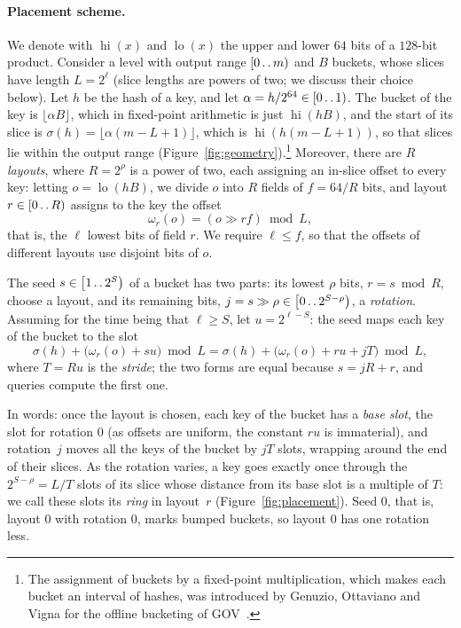 \documentclass[11pt]{article}
\def\..{\,\mathpunct{\ldotp\ldotp}} %
\newcommand{\hi}{\operatorname{hi}}
\begin{document}
\paragraph{Placement scheme.}
We denote with $\hi(x)$ and $\operatorname{lo}(x)$ the upper and lower $64$
bits of a $128$-bit product. Consider a level with output range $[0\..m)$ and
$B$ buckets, whose slices have length $L=2^\ell$ (slice lengths are powers of
two; we discuss their choice below). Let $h$ be the hash of a key, and let
$\alpha=h/2^{64}\in[0\..1)$. The bucket of the key is $\lfloor\alpha
B\rfloor$, which in fixed-point arithmetic is just $\hi(hB)$, and the start of
its slice is $\sigma(h)=\lfloor\alpha(m-L+1)\rfloor$, which is
$\hi(h(m-L+1))$, so that slices lie within the output range
(Figure~\ref{fig:geometry}).\footnote{The assignment of buckets by a fixed-point
multiplication, which makes each bucket an interval of hashes, was introduced
by Genuzio, Ottaviano and Vigna for the offline bucketing of
GOV~\cite{GOVFSCCSMPHF}.} Moreover, there
are $R$ \emph{layouts}, where $R=2^\rho$ is a power of two, each assigning
an in-slice offset to every key:
letting $o=\operatorname{lo}(hB)$, we divide $o$ into $R$ fields of
$f=64/R$ bits, and layout $r\in[0\..R)$ assigns to the key the offset
\[
\omega_r(o)=(o\gg rf) \bmod L,
\]
that is, the $\ell$ lowest bits of field $r$. We require $\ell\le f$, so
that the offsets of different layouts use disjoint bits of $o$.

The seed $s\in\bigl[1\..2^S\bigr)$ of a bucket has two parts: its lowest $\rho$ bits,
$r=s\bmod R$, choose a layout, and its remaining bits,
$j=s\gg\rho\in\bigl[0\..2^{S-\rho}\bigr)$, a \emph{rotation}. Assuming for the
time being that $\ell\geq S$, let $u=2^{\ell-S}$: the seed maps each key of
the bucket to the slot
\[
\sigma(h)+\bigl(\omega_r(o)+su\bigr)\bmod L
=\sigma(h)+\bigl(\omega_r(o)+ru+jT\bigr)\bmod L,
\]
where $T=Ru$ is the \emph{stride}; the two forms are equal because $s=jR+r$,
and queries compute the first one.

In words: once the layout is chosen, each
key of the bucket has a \emph{base slot}, the slot for rotation $0$ (as
offsets are uniform, the constant $ru$ is immaterial), and rotation~$j$ moves
all the keys of the bucket by $jT$ slots, wrapping around the end of their
slices. As the rotation varies, a key goes
exactly once through the $2^{S-\rho}=L/T$ slots of its slice whose distance
from its base slot is a multiple of $T$: we call these slots its \emph{ring}
in layout~$r$ (Figure~\ref{fig:placement}). Seed $0$, that is, layout $0$
with rotation $0$, marks bumped buckets, so layout $0$ has one rotation less.
\end{document}
